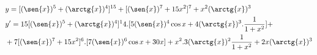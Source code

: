 \begin{ex}
\begin{align}
&y=[(\sen{x})^5+(\arctg{x})^4]^{15}+[(\sen{x})^7+15x^2]^7+x^2(\arctg{x})^3\nonumber\\
&y'=15[(\sen{x})^5+(\arctg{x})^4]^14.[5(\sen{x})^4\cos{x}+4(\arctg{x})^3.\frac{1}{1+x^2}]+\nonumber\\
&+7[(\sen{x})^7+15x^2]^6.[7(\sen{x})^6\cos{x}+30x]+x^2.3(\arctg{x})^2\frac{1}{1+x^2}+2x(\arctg{x})^3\nonumber
\end{align}
\end{ex}